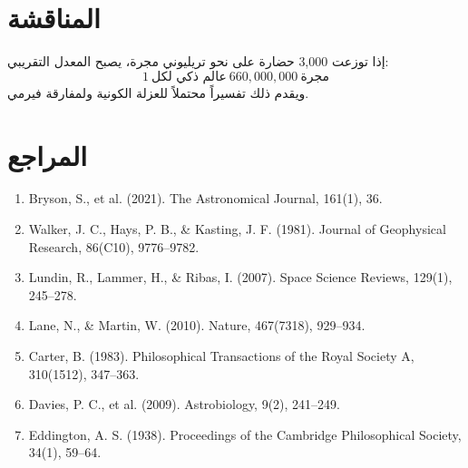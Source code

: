 \documentclass[12pt,a4paper]{article}
\begin{document}
\section{المناقشة}
إذا توزعت 3,000 حضارة على نحو تريليوني مجرة، يصبح المعدل التقريبي:
\[
1\ \text{عالم ذكي لكل}\ 660{,}000{,}000\ \text{مجرة}
\]
ويقدم ذلك تفسيراً محتملاً للعزلة الكونية ولمفارقة فيرمي.

\section{المراجع}
\begin{enumerate}
\item Bryson, S., et al. (2021). The Astronomical Journal, 161(1), 36.
\item Walker, J. C., Hays, P. B., \& Kasting, J. F. (1981). Journal of Geophysical Research, 86(C10), 9776--9782.
\item Lundin, R., Lammer, H., \& Ribas, I. (2007). Space Science Reviews, 129(1), 245--278.
\item Lane, N., \& Martin, W. (2010). Nature, 467(7318), 929--934.
\item Carter, B. (1983). Philosophical Transactions of the Royal Society A, 310(1512), 347--363.
\item Davies, P. C., et al. (2009). Astrobiology, 9(2), 241--249.
\item Eddington, A. S. (1938). Proceedings of the Cambridge Philosophical Society, 34(1), 59--64.
\end{enumerate}
\end{document}
